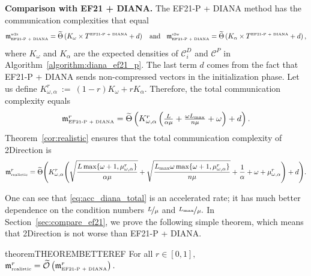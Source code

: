 \documentclass{article} %
\newcommand{\cC}{\mathcal{C}}
\newcommand{\cO}{\mathcal{O}}
\theoremstyle{plain}
\theoremstyle{definition}
\theoremstyle{remark}
\newcommand{\eqdef}{:=}
\newcommand{\squeeze}{\textstyle}
\newcommand{\green}{\color{mydarkgreen}}
\newcommand{\algname}[1]{{\small\green\sf #1}}
\begin{document}
{\bf Comparison with \algname{EF21 + DIANA}.}
The \algname{EF21-P + DIANA} method has the communication complexities that equal $$\mathfrak{m}^{{\scriptscriptstyle \textnormal{w2s}}}_{{\scriptscriptstyle \textnormal{EF21-P + DIANA}}} = \widetilde{\Theta}\left(K_{\omega} \times T^{\scriptscriptstyle \textnormal{EF21-P + DIANA}} + d\right) \;\; \textnormal{ and } \;\; \mathfrak{m}^{{\scriptscriptstyle \textnormal{s2w}}}_{{\scriptscriptstyle \textnormal{EF21-P + DIANA}}} = \widetilde{\Theta}\left(K_{\alpha} \times T^{\scriptscriptstyle \textnormal{EF21-P + DIANA}} + d\right),$$
where $K_{\omega}$ and $K_{\alpha}$ are the expected densities of $\cC_i^{D}$ and $\cC^{P}$ in Algorithm~\ref{algorithm:diana_ef21_p}. The last term $d$ comes from the fact that \algname{EF21-P + DIANA} sends non-compressed vectors in the initialization phase. Let us define $K_{\omega, \alpha}^r~\eqdef~(1 - r)K_{\omega} + r K_{\alpha}.$ Therefore, the total communication complexity equals
 \begin{align}
  \label{eq:ef21_p_diana}
  \squeeze
  \mathfrak{m}^{r}_{{\scriptscriptstyle \textnormal{EF21-P + DIANA}}} = \widetilde{\Theta}\left(K_{\omega, \alpha}^r \left(\frac{L}{\alpha \mu} + \frac{\omega L_{\max}}{n \mu} + \omega\right) + d\right).
\end{align}
Theorem~\ref{cor:realistic} ensures that the total communication complexity of \algname{2Direction} is
{\small \begin{align}
  \label{eq:acc_diana_total}
  \mathfrak{m}^{r}_{{\scriptscriptstyle \textnormal{realistic}}} = \widetilde{\Theta}\Bigg(K_{\omega, \alpha}^r \Bigg(\sqrt{\frac{L \max\{\omega + 1, \mu^r_{\omega, \alpha}\}}{\alpha \mu}} + \sqrt{\frac{L_{\max} \omega \max\{\omega + 1, \mu^r_{\omega, \alpha}\}}{n \mu}} + \frac{1}{\alpha} + \omega + \mu^r_{\omega, \alpha}\Bigg) + d\Bigg).
\end{align}}

 One can see that \eqref{eq:acc_diana_total} is an accelerated rate; it has much better dependence on the condition numbers $\nicefrac{L}{\mu}$ and $\nicefrac{L_{\max}}{\mu}.$ In Section~\ref{sec:compare_ef21}, we prove the following simple theorem, which means  that \algname{2Direction} is not worse than \algname{EF21-P + DIANA}.
\begin{restatable}{theorem}{THEOREMBETTEREF}
  \label{theorem:better_ef21}
  For all $r \in [0, 1],$ $\mathfrak{m}^{r}_{{\scriptscriptstyle \textnormal{realistic}}} = \widetilde{\cO}\left(\mathfrak{m}^{r}_{{\scriptscriptstyle \textnormal{EF21-P + DIANA}}}\right).$
\end{restatable}
\end{document}
